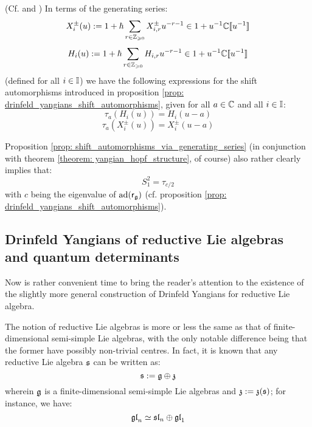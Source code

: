         \begin{proposition} \label{prop: shift_automorphisms_via_generating_series}
            (Cf. \cite[Subsection 2.8]{gautam_and_toledano_laredo_yangians_quantum_loop_algebras_and_abelian_difference_equations} and \cite[Remark 2.4]{wendlandt_formal_shift_operators_on_yangian_doubles}) In terms of the generating series:
                $$X_i^{\pm}(u) := 1 + \hbar \sum_{r \in \mathbb{Z}_{\geqslant 0}} X_{i, r}^{\pm} u^{-r - 1} \in 1 + u^{-1} \mathbb{C}[\![u^{-1}]\!]$$
                $$H_i(u) := 1 + \hbar \sum_{r \in \mathbb{Z}_{\geqslant 0}} H_{i, r} u^{-r - 1} \in 1 + u^{-1} \mathbb{C}[\![u^{-1}]\!]$$
            (defined for all $i \in \mathbb{I}$) we have the following expressions for the shift automorphisms introduced in proposition \ref{prop: drinfeld_yangians_shift_automorphisms}, given for all $a \in \mathbb{C}$ and all $i \in \mathbb{I}$:
                $$\tau_a(H_i(u)) = H_i(u - a)$$
                $$\tau_a(X_i^{\pm}(u)) = X_i^{\pm}(u - a)$$
        \end{proposition}
        \begin{remark}
            Proposition \ref{prop: shift_automorphisms_via_generating_series} (in conjunction with theorem \ref{theorem: yangian_hopf_structure}, of course) also rather clearly implies that:
                $$S_1^2 = \tau_{c/2}$$
            with $c$ being the eigenvalue of $\mathrm{ad}(\mathsf{r}_{\mathfrak{g}})$ (cf. proposition \ref{prop: drinfeld_yangians_shift_automorphisms}).
        \end{remark}

    \subsection{Drinfeld Yangians of reductive Lie algebras and quantum determinants} \label{subsection: yangians_of_reductive_lie_algebras}
        Now is rather convenient time to bring the reader's attention to the existence of the slightly more general construction of Drinfeld Yangians for reductive Lie algebra.

        The notion of reductive Lie algebras is more or less the same as that of finite-dimensional semi-simple Lie algebras, with the only notable difference being that the former have possibly non-trivial centres. In fact, it is known that any reductive Lie algebra $\mathfrak{s}$ can be written as:
            $$\mathfrak{s} := \mathfrak{g} \oplus \mathfrak{z}$$
        wherein $\mathfrak{g}$ is a finite-dimensional semi-simple Lie algebras and $\mathfrak{z} := \mathfrak{z}(\mathfrak{s})$; for instance, we have:
            $$\mathfrak{gl}_n \simeq \mathfrak{sl}_n \oplus \mathfrak{gl}_1$$

